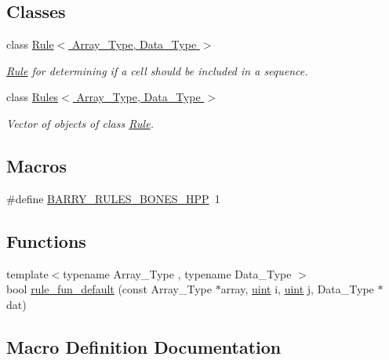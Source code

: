 \subsection*{Classes}
\begin{DoxyCompactItemize}
\item 
class \hyperlink{class_rule}{Rule$<$ Array\+\_\+\+Type, Data\+\_\+\+Type $>$}
\begin{DoxyCompactList}\small\item\em \hyperlink{class_rule}{Rule} for determining if a cell should be included in a sequence. \end{DoxyCompactList}\item 
class \hyperlink{class_rules}{Rules$<$ Array\+\_\+\+Type, Data\+\_\+\+Type $>$}
\begin{DoxyCompactList}\small\item\em Vector of objects of class \hyperlink{class_rule}{Rule}. \end{DoxyCompactList}\end{DoxyCompactItemize}
\subsection*{Macros}
\begin{DoxyCompactItemize}
\item 
\#define \hyperlink{barry_8hpp_a052806ac014ba2a01e07dc2c488e7dca}{B\+A\+R\+R\+Y\+\_\+\+R\+U\+L\+E\+S\+\_\+\+B\+O\+N\+E\+S\+\_\+\+H\+PP}~1
\end{DoxyCompactItemize}
\subsection*{Functions}
\begin{DoxyCompactItemize}
\item 
{\footnotesize template$<$typename Array\+\_\+\+Type , typename Data\+\_\+\+Type $>$ }\\bool \hyperlink{rules-bones_8hpp_aaeb0527576529579dd4cb51cb3ba73e0}{rule\+\_\+fun\+\_\+default} (const Array\+\_\+\+Type $\ast$array, \hyperlink{typedefs_8hpp_a91ad9478d81a7aaf2593e8d9c3d06a14}{uint} i, \hyperlink{typedefs_8hpp_a91ad9478d81a7aaf2593e8d9c3d06a14}{uint} j, Data\+\_\+\+Type $\ast$dat)
\end{DoxyCompactItemize}


\subsection{Macro Definition Documentation}
\mbox{\label{barry_8hpp_a052806ac014ba2a01e07dc2c488e7dca}} 
